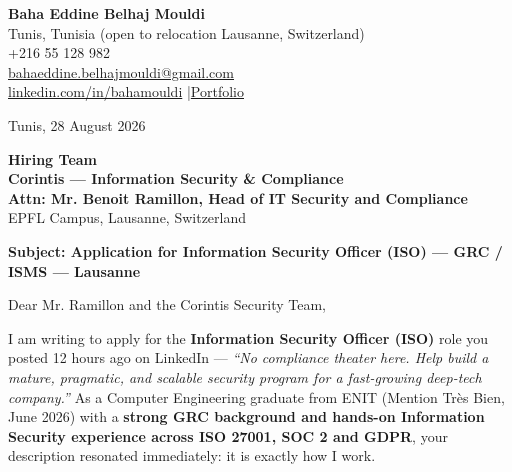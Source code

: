 \documentclass[a4paper,10pt]{article}
\begin{document}
\begin{flushright}
{\bfseries Baha Eddine Belhaj Mouldi}\\
Tunis, Tunisia (open to relocation Lausanne, Switzerland)\\
+216 55 128 982\\
\href{mailto:bahaeddine.belhajmouldi@gmail.com}{bahaeddine.belhajmouldi@gmail.com}\\
\href{https://linkedin.com/in/bahamouldi}{linkedin.com/in/bahamouldi} \quad|\quad \href{https://bahamouldi.github.io/portfolio/}{Portfolio}\\
\end{flushright}

\vspace{0.4cm}

\begin{flushleft}
Tunis, 28 August 2026

\vspace{0.6cm}

{\bfseries Hiring Team}\\
{\bfseries Corintis — Information Security \& Compliance}\\
{\bfseries Attn: Mr. Benoit Ramillon, Head of IT Security and Compliance}\\
EPFL Campus, Lausanne, Switzerland

\vspace{0.4cm}

{\bfseries Subject: Application for Information Security Officer (ISO) — GRC / ISMS — Lausanne}
\end{flushleft}

\vspace{0.3cm}

Dear Mr. Ramillon and the Corintis Security Team,

\vspace{0.2cm}

I am writing to apply for the \textbf{Information Security Officer (ISO)} role you posted 12 hours ago on LinkedIn — \textit{``No compliance theater here. Help build a mature, pragmatic, and scalable security program for a fast-growing deep-tech company.''} As a Computer Engineering graduate from ENIT (Mention Très Bien, June 2026) with a \textbf{strong GRC background and hands-on Information Security experience across ISO 27001, SOC 2 and GDPR}, your description resonated immediately: it is exactly how I work.
\end{document}
